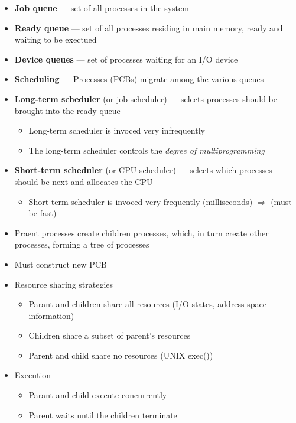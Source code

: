 \documentclass[titlepage]{article}
\begin{document}
  \begin{itemize}
    \item {\color{blue} \textbf{Job queue}} --- set of all processes in the system
    \item {\color{blue} \textbf{Ready queue}} --- set of all processes residing in main memory, ready and waiting to be exectued
    \item {\color{blue} \textbf{Device queues}} --- set of processes waiting for an I/O device
    \item {\color{blue} \textbf{Scheduling}} --- Processes (PCBs) migrate among the various queues
    \item {\color{blue} \textbf{Long-term scheduler}} (or job scheduler) --- selects processes should be brought into the ready queue
    \begin{itemize}
      \item Long-term scheduler is invoced very infrequently
      \item The long-term scheduler controls the \textit{degree of multiprogramming}
    \end{itemize}
    \item {\color{blue} \textbf{Short-term scheduler}} (or CPU scheduler) --- selects which processes should be next and allocates the CPU
    \begin{itemize}
      \item Short-term scheduler is invoced very frequently (milliseconds) $\Rightarrow$ (must be fast)
    \end{itemize}
    \item Praent processes create children processes, which, in turn create other processes, forming a tree of processes
    \item Must construct new PCB
    \item Resource sharing strategies
    \begin{itemize}
      \item Parant and children share all resources (I/O states, address space information)
      \item Children share a subset of parent's resources
      \item Parent and child share no resources (UNIX exec())
    \end{itemize}
    \item Execution
    \begin{itemize}
      \item Parant and child execute concurrently
      \item Parent waits until the children terminate
    \end{itemize}
  \end{itemize}
\end{document}
